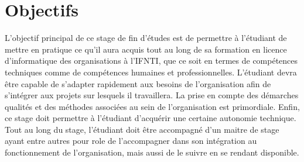 \section{Objectifs}
L’objectif principal de ce stage de fin d’études est de permettre à l’étudiant de mettre en pratique ce qu’il aura acquis tout au long de sa formation en licence d’informatique des organisations à l’IFNTI, que ce soit en termes de compétences techniques comme de compétences humaines et professionnelles. L’étudiant devra être capable de s’adapter rapidement aux besoins de l’organisation afin de s’intégrer aux projets sur lesquels il travaillera. La prise en compte des démarches qualités et des méthodes associées au sein de l’organisation est primordiale. Enfin, ce stage doit permettre à l’étudiant d’acquérir une certaine autonomie technique.\\
Tout au long du stage, l’étudiant doit être accompagné d’un maitre de stage ayant entre autres pour role de l’accompagner dans son intégration au fonctionnement de l’organisation, mais aussi de le suivre en se rendant disponible.